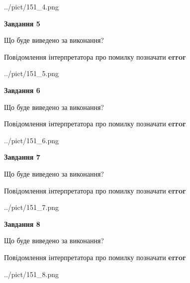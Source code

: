 \documentclass[12pt, ukrainian]{article}
\begin{document}
{\begin{center}
	{../pict/151_4.png}
\end{center}
\newpage

{\begin {center}\textbf{Завдання 5}\end {center}}\par
Що буде виведено за виконання? \par
Повідомлення інтерпретатора про помилку позначати \textbf{error}

\begin{center}
	{../pict/151_5.png}
\end{center}
\newpage

{\begin {center}\textbf{Завдання 6}\end {center}}\par
Що буде виведено за виконання? \par
Повідомлення інтерпретатора про помилку позначати \textbf{error}

\begin{center}
	{../pict/151_6.png}
\end{center}
\newpage

{\begin {center}\textbf{Завдання 7}\end {center}}\par
Що буде виведено за виконання? \par
Повідомлення інтерпретатора про помилку позначати \textbf{error}

\begin{center}
	{../pict/151_7.png}
\end{center}
\newpage

{\begin {center}\textbf{Завдання 8}\end {center}}\par
Що буде виведено за виконання? \par
Повідомлення інтерпретатора про помилку позначати \textbf{error}

\begin{center}
	{../pict/151_8.png}
\end{center}
\newpage

}
\end{document}
